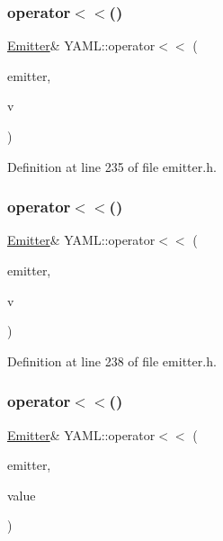 \subsubsection{\texorpdfstring{operator$<$$<$()}{operator<<()}\hspace{0.1cm}{\footnotesize\ttfamily [31/35]}}
{\footnotesize\ttfamily \mbox{\hyperlink{class_y_a_m_l_1_1_emitter}{Emitter}}\& Y\+A\+M\+L\+::operator$<$$<$ (\begin{DoxyParamCaption}\item[{\mbox{\hyperlink{class_y_a_m_l_1_1_emitter}{Emitter}} \&}]{emitter,  }\item[{float}]{v }\end{DoxyParamCaption})\hspace{0.3cm}{\ttfamily [inline]}}



Definition at line 235 of file emitter.\+h.

\mbox{\label{namespace_y_a_m_l_a1c198c408cbcbeec037650eedb55b1d7}} 
\subsubsection{\texorpdfstring{operator$<$$<$()}{operator<<()}\hspace{0.1cm}{\footnotesize\ttfamily [32/35]}}
{\footnotesize\ttfamily \mbox{\hyperlink{class_y_a_m_l_1_1_emitter}{Emitter}}\& Y\+A\+M\+L\+::operator$<$$<$ (\begin{DoxyParamCaption}\item[{\mbox{\hyperlink{class_y_a_m_l_1_1_emitter}{Emitter}} \&}]{emitter,  }\item[{double}]{v }\end{DoxyParamCaption})\hspace{0.3cm}{\ttfamily [inline]}}



Definition at line 238 of file emitter.\+h.

\mbox{\label{namespace_y_a_m_l_ac07c6e8ecab18eed882c4a626e3248de}} 
\subsubsection{\texorpdfstring{operator$<$$<$()}{operator<<()}\hspace{0.1cm}{\footnotesize\ttfamily [33/35]}}
{\footnotesize\ttfamily \mbox{\hyperlink{class_y_a_m_l_1_1_emitter}{Emitter}}\& Y\+A\+M\+L\+::operator$<$$<$ (\begin{DoxyParamCaption}\item[{\mbox{\hyperlink{class_y_a_m_l_1_1_emitter}{Emitter}} \&}]{emitter,  }\item[{\mbox{\hyperlink{namespace_y_a_m_l_a67c320aa50d3de7ecba1d0b8775dd684}{E\+M\+I\+T\+T\+E\+R\+\_\+\+M\+A\+N\+IP}}}]{value }\end{DoxyParamCaption})\hspace{0.3cm}{\ttfamily [inline]}}



